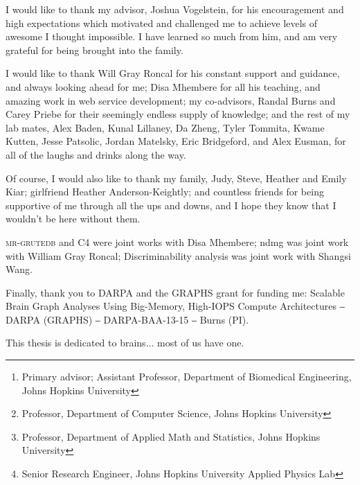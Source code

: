 \begin{frontmatter}
\begin{abstract}
\vspace{1cm}

\noindent Advisors: Joshua Vogelstein\footnote{Primary advisor; Assistant Professor, Department of Biomedical Engineering, Johns Hopkins University}, Randal Burns\footnote{Professor, Department of Computer Science, Johns Hopkins University}, Carey Priebe\footnote{Professor, Department of Applied Math and Statistics, Johns Hopkins University}, William Gray Roncal\footnote{Senior Research Engineer, Johns Hopkins University Applied Physics Lab}

\end{abstract}

\begin{acknowledgment}

I would like to thank my advisor, Joshua Vogelstein, for his encouragement and high expectations which motivated and challenged me to achieve levels of awesome I thought impossible. I have learned so much from him, and am very grateful for being brought into the family.

I would like to thank Will Gray Roncal for his constant support and guidance, and always looking ahead for me; Disa Mhembere for all his teaching, and amazing work in web service development; my co-advisors, Randal Burns and Carey Priebe for their seemingly endless supply of knowledge; and the rest of my lab mates, Alex Baden, Kunal Lillaney, Da Zheng, Tyler Tommita, Kwame Kutten, Jesse Patsolic, Jordan Matelsky, Eric Bridgeford, and Alex Eusman, for all of the laughs and drinks along the way.

Of course, I would also like to thank my family, Judy, Steve, Heather and Emily Kiar; girlfriend Heather Anderson-Keightly; and countless friends for being supportive of me through all the ups and downs, and I hope they know that I wouldn't be here without them.

\textsc{mr-grutedb} and C4 were joint works with Disa Mhembere; ndmg was joint work with William Gray Roncal; Discriminability analysis was joint work with Shangsi Wang.

Finally, thank you to DARPA and the GRAPHS grant for funding me: Scalable Brain Graph Analyses Using Big-Memory, High-IOPS Compute Architectures ‒ DARPA (GRAPHS) ‒ DARPA-BAA-13-15 ‒ Burns (PI).

\end{acknowledgment}

\begin{dedication}
 
This thesis is dedicated to brains... most of us have one.

\end{dedication}

\tableofcontents

\listoftables

\listoffigures

\end{frontmatter}
